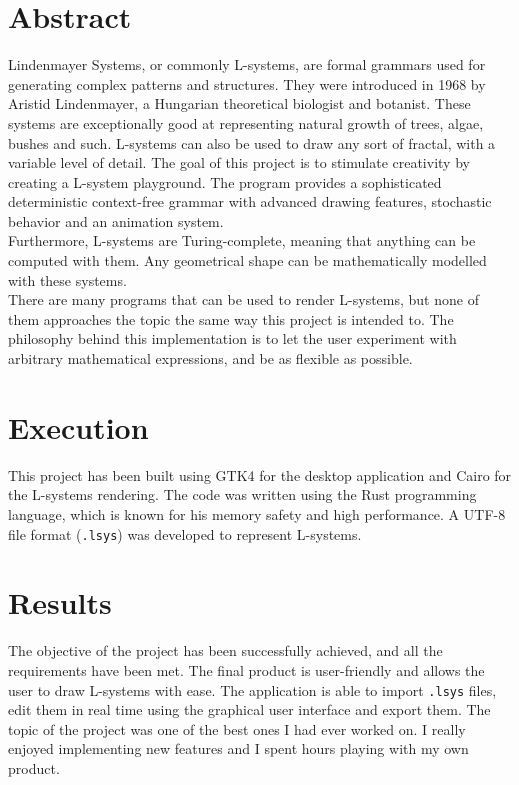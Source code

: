 \documentclass[a4paper]{article}
\begin{document}
\vspace{2cm}

\thispagestyle{empty} %

\section*{Abstract}

Lindenmayer Systems, or commonly L-systems,
are formal grammars used for generating complex patterns and structures.
They were introduced in 1968 by Aristid Lindenmayer, a Hungarian theoretical biologist and botanist.
These systems are exceptionally good at representing natural growth of trees, algae, bushes and such.
L-systems can also be used to draw any sort of fractal, with a variable level of detail.
The goal of this project is to stimulate creativity
by creating a L-system playground.
The program provides a sophisticated deterministic context-free grammar
with advanced drawing features, stochastic behavior and an animation system. \\
Furthermore, L-systems are Turing-complete, meaning that anything can be computed
with them.
Any geometrical shape can be mathematically modelled with these systems. \\
There are many programs that can be used to render L-systems, but none of them
approaches the topic the same way this project is intended to.
The philosophy behind this implementation is to let the user experiment
with arbitrary mathematical expressions, and be as flexible as possible.

\section*{Execution}

This project has been built using GTK4 for the desktop application
and Cairo for the L-systems rendering.
The code was written using the Rust programming language,
which is known for his memory safety and high performance.
A UTF-8 file format (\texttt{.lsys}) was developed to represent
L-systems.


\section*{Results}

The objective of the project has been successfully achieved, and all the requirements have been met.
The final product is user-friendly and allows the user to draw L-systems with ease.
The application is able to import \texttt{.lsys} files,
edit them in real time using the graphical user interface and export them.
The topic of the project was one of the best ones I had ever worked on.
I really enjoyed implementing new features and I spent hours playing
with my own product.
\end{document}
